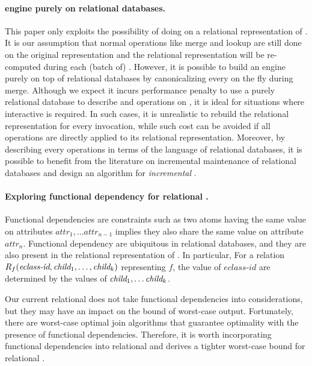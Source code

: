\paragraph{\Egraph engine purely on relational databases.} This paper only exploits the possibility of doing \ematching on a relational representation of \egraphs. It is our assumption that normal \egraph operations like merge and lookup are still done on the original \egraph representation and the relational representation will be re-computed during each (batch of) \ematching.   However, it is possible to build an \egraph engine purely on top of relational databases by canonicalizing every \enode on the fly during merge. Although we expect it incurs performance penalty to use a purely relational database to describe \egraph and operations on \egraph, it is ideal for situations where interactive \ematching is required. In such cases, it is unrealistic to rebuild the relational representation for every \ematching invocation, while such cost can be avoided if all \egraph operations are directly applied to its relational representation. Moreover, by describing every \ematching operations in terms of the language of relational databases, it is possible to benefit from the literature on incremental maintenance of relational databases and design an algorithm for {\it incremental} \ematching.

\paragraph{Exploring functional dependency for relational \ematching.} Functional dependencies are constraints such as two atoms having the same value on attributes $\textit{attr}_1,\ldots \textit{attr}_{n-1}$ implies they also share the same value on attribute $\textit{attr}_n$. Functional dependency are ubiquitous in relational databases, and they are also present in the relational representation of \egraphs. In particular, For a relation $R_f(\textit{eclass-id},\textit{child}_1,\ldots,\textit{child}_k)$ representing $f$, the value of $\textit{eclass-id}$ are determined by the values of $\textit{child}_1,\ldots \textit{child}_k$.

Our current relational \ematching does not take functional dependencies into considerations, but they may have an impact on the bound of worst-case output. Fortunately, there are worst-case optimal join algorithms that guarantee optimality with the presence of functional dependencies. Therefore, it is worth incorporating functional dependencies into relational \ematching and derives a tighter worst-case bound for relational \ematching.

